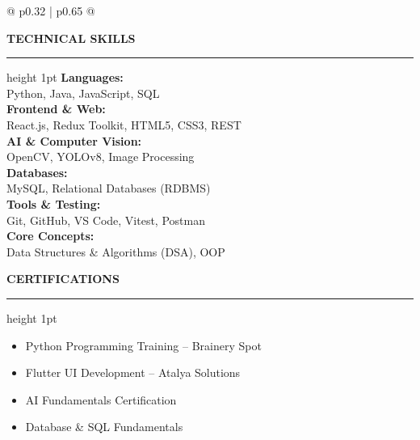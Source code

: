 \documentclass[a4paper,10pt]{article}
\begin{document}
\begin{mdframed}[style=resumebox]
\begin{tabularx}{\textwidth}{@{} p{0.32\textwidth} | p{0.65\textwidth} @{}}
\begin{minipage}[t]{\linewidth}
    \vspace{8pt}
    \textbf{\color{primaryblack}\large TECHNICAL SKILLS}
    \vspace{2pt}\hrule height 1pt\vspace{3pt}
    \textbf{Languages:}\\
    Python, Java, JavaScript, SQL\\[3pt]
    \textbf{Frontend \& Web:}\\
    React.js, Redux Toolkit, HTML5, CSS3, REST\\[3pt]
    \textbf{AI \& Computer Vision:}\\
    OpenCV, YOLOv8, Image Processing\\[3pt]
    \textbf{Databases:}\\
    MySQL, Relational Databases (RDBMS)\\[3pt]
    \textbf{Tools \& Testing:}\\
    Git, GitHub, VS Code, Vitest, Postman\\[3pt]
    \textbf{Core Concepts:}\\
    Data Structures \& Algorithms (DSA), OOP

    \vspace{8pt}
    \textbf{\color{primaryblack}\large CERTIFICATIONS}
    \vspace{2pt}\hrule height 1pt\vspace{3pt}
    \begin{itemize}
        \item Python Programming Training -- Brainery Spot
        \item Flutter UI Development -- Atalya Solutions
        \item AI Fundamentals Certification
        \item Database \& SQL Fundamentals
    \end{itemize}


\end{minipage}
\end{tabularx}
\end{mdframed}
\end{document}
